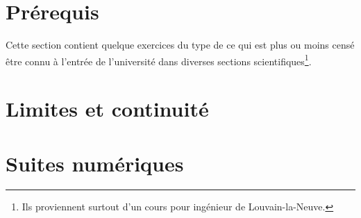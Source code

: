 
\section{Prérequis}

Cette section contient quelque exercices du type de ce qui est plus ou moins censé être connu à l'entrée de l'université dans diverses sections scientifiques\footnote{Ils proviennent surtout d'un cours pour ingénieur de Louvain-la-Neuve.}.





\section{Limites et continuité}


\section{Suites numériques}

